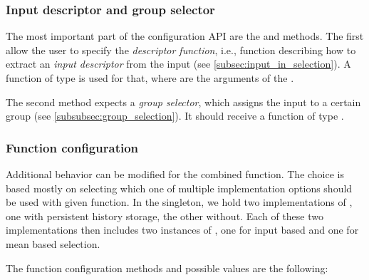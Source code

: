 \subsubsection{Input descriptor and group selector}

The most important part of the configuration API are the  and  methods. The first allow the user to specify the \textit{descriptor function}, i.e., function describing how to extract an \textit{input descriptor} from the input (see \ref{subsec:input_in_selection}). A function of type  is used for that, where  are the arguments of the . 

The second method expects a \textit{group selector}, which assigns the input to a certain group (see \ref{subsubsec:group_selection}). It should receive a function of type .

\subsubsection{Function configuration}

Additional behavior can be modified for the combined function. The choice is based mostly on selecting which one of multiple implementation options should be used with given function. In the  singleton, we hold two implementations of , one with persistent history storage, the other without. Each of these two implementations then includes two instances of  , one for input based and one for mean based selection.

The function configuration methods and possible values are the following:


